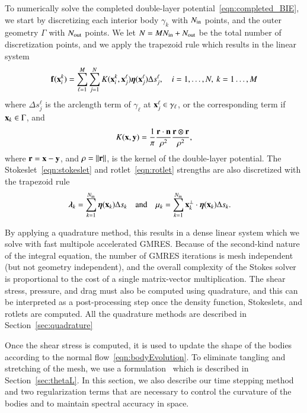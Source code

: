 \documentclass[preprint, 10pt]{elsarticle}
\begin{document}
To numerically solve the completed double-layer
potential~\eqref{eqn:completed_BIE}, we start by discretizing each
interior body $\gamma_k$ with $N_{\mathrm{in}}$ points, and the outer geometry
$\Gamma$ with $N_{\mathrm{out}}$ points.  We let $N = MN_{\mathrm{in}} + N_{\mathrm{out}}$ be the
total number of discretization points, and we apply the trapezoid rule
which results in the linear system
\begin{align*}
  {\mathbf{f}}({\mathbf{x}}_i^k) = \sum_{\ell = 1}^{M}\sum_{j=1}^{N} 
    K({\mathbf{x}}_i^k,{\mathbf{x}}_j^\ell) {\boldsymbol\eta}({\mathbf{x}}_j^\ell) 
      \Delta s_{j}^{\ell}, \quad i=1,\ldots,N, \: k=1\ldots,M
\end{align*}
where $\Delta s_j^\ell$ is the arclength term of $\gamma_\ell$ at
${\mathbf{x}}_j^\ell \in \gamma_\ell$, or the corresponding term if ${\mathbf{x}}_k \in
\Gamma$, and
\begin{align*}
  K({\mathbf{x}},{\mathbf{y}}) = \frac{1}{\pi} \frac{{\mathbf{r}} \cdot {\mathbf{n}}}{\rho^2} 
      \frac{{\mathbf{r}} \otimes {\mathbf{r}}}{\rho^2},
\end{align*}
where ${\mathbf{r}} = {\mathbf{x}} - {\mathbf{y}}$, and $\rho = \|{\mathbf{r}}\|$, is the kernel of the
double-layer potential.  The Stokeslet~\eqref{eqn:stokeslet} and
rotlet~\eqref{eqn:rotlet} strengths are also discretized with the
trapezoid rule
\begin{align*}
  {\boldsymbol\lambda}_k &= \sum_{k=1}^{N_{\mathrm{in}}} {\boldsymbol\eta}({\mathbf{x}}_k) 
    \Delta s_{k} \quad \text{and} \quad
  \mu_k = \sum_{k=1}^{N_{\mathrm{in}}} {\mathbf{x}}_k^\perp \cdot
    {\boldsymbol\eta}({\mathbf{x}}_k) \Delta s_{k}.
\end{align*}



By applying a quadrature method, this results in a dense linear system
which we solve with fast multipole accelerated GMRES.  Because of the
second-kind nature of the integral equation, the number of GMRES
iterations is mesh independent (but not geometry independent), and the
overall complexity of the Stokes solver is proportional to the cost of a
single matrix-vector multiplication.  The shear stress, pressure, and
drag must also be computed using quadrature, and this can be interpreted
as a post-processing step once the density function, Stokeslets, and
rotlets are computed.  All the quadrature methods are described in
Section~\ref{sec:quadrature}

Once the shear stress is computed, it is used to update the shape of the
bodies according to the normal flow~\eqref{eqn:bodyEvolution}.  To
eliminate tangling and stretching of the mesh, we use a \thL
formulation~\cite{hou-low-she1994} which is described in
Section~\ref{sec:thetaL}.  In this section, we also describe our time
stepping method and two regularization terms that are necessary to
control the curvature of the bodies and to maintain spectral accuracy in
space.
\end{document}
